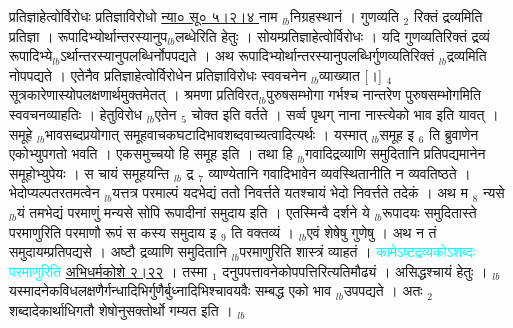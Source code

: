 \documentclass[article,12pt,a4paper]{memoir}%
\newcommand{\quotelemma}[1]{\textcolor{cyan}{#1}}
\newcounter{parCount}
\begin{document}
	  
	  \pstart \leavevmode%
	\hphantom{.}प्रतिज्ञाहेत्वोर्विरोधः प्रतिज्ञाविरोधो \href{http://sarit.indology.info/?cref=ns\%C5\%AB.5.2.4}{न्या० सू० ५।२।४ }\cite[9b10]{vn-msN} नाम {\tiny $_{lb}$}निग्रहस्थानं । गुणव्यति {\tiny $_{2}$} रिक्तं द्रव्यमिति प्रतिज्ञा । रूपादिभ्योर्थान्तरस्यानुप{\tiny $_{lb}$}लब्धेरिति हेतुः । सोयम्प्रतिज्ञाहेत्वोर्विरोधः । यदि गुणव्यतिरिक्तं द्रव्यं रूपादिभ्ये{\tiny $_{lb}$}ऽर्थान्तरस्यानुपलब्धिर्नोपपद्यते । अथ रूपादिभ्योर्थान्तरस्यानुपलब्धिर्गुणव्यतिरिक्तं {\tiny $_{lb}$}द्रव्यमिति नोपपद्यते । एतेनैव प्रतिज्ञाहेत्वोर्विरोधेन प्रतिज्ञाविरोधः स्ववचनेन {\tiny $_{lb}$}व्याख्यात [।] {\tiny $_{4}$} सूत्रकारेणास्योपलक्षणार्थमुक्तमेतत् । श्रमणा \cite[10a1]{vn-msN} प्रतिविरत{\tiny $_{lb}$}पुरुषसम्भोगा गर्भश्च नान्तरेण पुरुषसम्भोगमिति स्ववचनव्याहतिः । हेतुविरोध {\tiny $_{lb}$}एतेन {\tiny $_{5}$} चोक्त इति वर्तते । सर्व्व पृथग् नाना नास्त्येको भाव इति यावत् । समूहे {\tiny $_{lb}$}भावसब्दप्रयोगात् समूहवाचकघटादिभावशब्दवाच्यत्वादित्यर्थः । यस्मात् {\tiny $_{lb}$}समूह इ {\tiny $_{6}$} ति ब्रुवाणेन एकोभ्युपगतो भवति । एकसमुच्चयो हि समूह इति । तथा हि {\tiny $_{lb}$}गवादिद्रव्याणि समुदितानि प्रतिपद्यमानेन समूहोभ्युपेयः । स चायं समूहयन्ति {\tiny $_{lb}$} \leavevmode{} द्र {\tiny $_{7}$} व्याण्येतानि गवादिभावेन व्यवस्थितानीति न व्यवतिष्ठते । भेदोप्यल्पतरतमत्वेन {\tiny $_{lb}$}यत्तत्र परमाल्पं यदभेद्यं ततो निवर्त्तते यतश्चायं भेदो निवर्त्तते तदेकं । अथ म {\tiny $_{8}$} न्यसे {\tiny $_{lb}$}यं तमभेद्यं परमाणुं मन्यसे सोपि रूपादीनां समुदाय इति । एतस्मिन्वै दर्शने ये {\tiny $_{lb}$}रूपादयः समुदितास्ते परमाणुरिति परमाणौ रूपं स कस्य समुदाय इ {\tiny $_{9}$} \leavevmode{} ति वक्तव्यं । {\tiny $_{lb}$}एवं शेषेषु गुणेषु । अथ न तं समुदायम्प्रतिपद्यसे । अष्टौ द्रव्याणि समुदितानि {\tiny $_{lb}$}परमाणुरिति शास्त्रं व्याहतं । \quotelemma{कामेऽष्टद्रव्यकोऽशब्दः परमाणुरिति \href{http://sarit.indology.info/?cref=ak.2.22}{अभिधर्मकोशे २।२२}} । तस्मा {\tiny $_{1}$} दनुपपत्तावनेकोपपत्तिरित्यतिमौढ्यं । असिद्धश्चायं हेतुः । {\tiny $_{lb}$}यस्मादनेकविधलक्षणैर्गन्धादिभिर्गुणैर्बुध्नादिभिश्चावयवैः सम्बद्ध एको भाव {\tiny $_{lb}$}उपपद्यते । अतः {\tiny $_{2}$} शब्दादेकार्थाधिगतौ शेषोनुसक्तोर्थो गम्यत इति ।
	{}
	\pend%
      {\tiny $_{lb}$}
\end{document}
